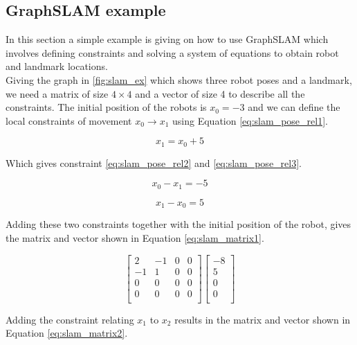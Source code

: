 \subsection{GraphSLAM example}

In this section a simple example is giving on how to use GraphSLAM which involves defining constraints and solving a system of equations to obtain robot and landmark locations.\\

Giving the graph in \autoref{fig:slam_ex} which shows three robot poses and a landmark, we need a matrix of size $4\times4$ and a vector of size 4 to describe all the constraints. The initial position of the robots is $x_0 = -3$ and we can define the local constraints of movement $x_0 \rightarrow x_1$ using Equation \ref{eq:slam_pose_rel1}.

\begin{equation}
\label{eq:slam_pose_rel1}
x_1 = x_0 + 5
\end{equation}

Which gives constraint \ref{eq:slam_pose_rel2} and \ref{eq:slam_pose_rel3}.

\begin{equation}
\label{eq:slam_pose_rel2}
x_0 - x_1 = -5
\end{equation}

\begin{equation}
\label{eq:slam_pose_rel3}
x_1 - x_0 = 5
\end{equation}

Adding these two constraints together with the initial position of the robot, gives the matrix and vector shown in Equation \ref{eq:slam_matrix1}.

\begin{equation}
\label{eq:slam_matrix1}
\begin{bmatrix}
2 & -1 & 0 & 0 \\
-1 & 1 & 0 & 0 \\
0 & 0 & 0 & 0 \\
0 & 0 & 0 & 0 \\
\end{bmatrix}
\begin{bmatrix}
-8 \\
5 \\
0 \\
0 \\
\end{bmatrix}
\end{equation}

Adding the constraint relating $x_1$ to $x_2$ results in the matrix and vector shown in Equation \ref{eq:slam_matrix2}.

